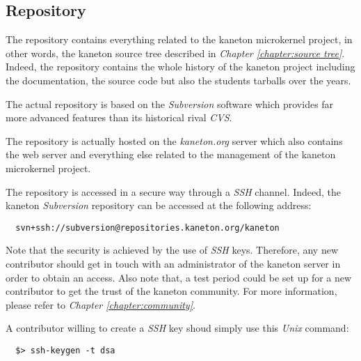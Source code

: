 %
%
%
%
%
%

%
%

\subsection{Repository}
\label{section:repository}

The repository contains everything related to the kaneton microkernel
project, in other words, the kaneton source tree described in
\textit{Chapter \ref{chapter:source tree}}. Indeed, the repository contains
the whole history of the kaneton project including the documentation, the
source code but also the students tarballs over the years.

The actual repository is based on the \textit{Subversion} software which
provides far more advanced features than its historical rival \textit{CVS}.

The repository is actually hosted on the \textit{kaneton.org} server which
also contains the web server and everything else related to the management
of the kaneton microkernel project.

The repository is accessed in a secure way through a \textit{SSH} channel.
Indeed, the kaneton \textit{Subversion} repository can be accessed at the
following address:

\begin{verbatim}
  svn+ssh://subversion@repositories.kaneton.org/kaneton
\end{verbatim}

Note that the security is achieved by the use of \textit{SSH} keys. Therefore,
any new contributor should get in touch with an administrator of the
kaneton server in order to obtain an access. Also note that, a test period
could be set up for a new contributor to get the trust of the kaneton
community. For more information, please refer to \textit{Chapter
\ref{chapter:community}}.

A contributor willing to create a \textit{SSH} key shoud simply use this
\textit{Unix} command:

\begin{verbatim}
  $> ssh-keygen -t dsa
\end{verbatim}


